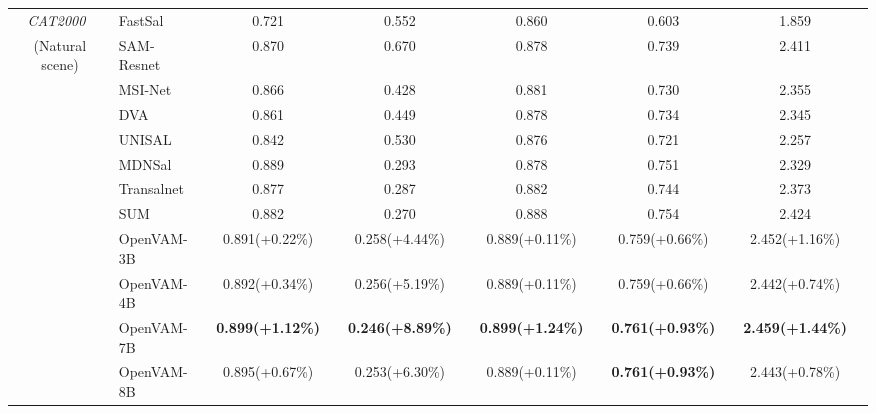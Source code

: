 \begin{table}[t]
{\begin{tabular}{c|lcccccccccc}
    \textit{CAT2000}~\cite{borji2015cat2000}
    & FastSal~\cite{hu2021fastsal} & 0.721 && 0.552 && 0.860 && 0.603 && 1.859 & \\
    (Natural scene)
    & SAM-Resnet~\cite{cornia2018predicting} & 0.870 && 0.670 && 0.878 && 0.739 && 2.411 & \\
    & MSI-Net~\cite{kroner2020contextual} & 0.866 && 0.428 && 0.881 && 0.730 && 2.355 & \\
    & DVA~\cite{wang2017deep} & 0.861 && 0.449 && 0.878 && 0.734 && 2.345 & \\
    & UNISAL~\cite{droste2020unified} & 0.842 && 0.530 && 0.876 && 0.721 && 2.257 & \\
    & MDNSal~\cite{reddy2020tidying} & 0.889 && 0.293 && 0.878 && 0.751 && 2.329 & \\
    & Transalnet~\cite{lou2022transalnet} & 0.877 && 0.287 && 0.882 && 0.744 && 2.373 & \\
    & SUM~\cite{hosseini2025sum} & 0.882 && 0.270 && 0.888 && 0.754 && 2.424 & \\
    \cmidrule{2-12}
    & \cellcolor[HTML]{DADCFF}OpenVAM-3B
    & \cellcolor[HTML]{DADCFF}0.891\scriptsize{(+0.22\%)} && 
      \cellcolor[HTML]{DADCFF}0.258\scriptsize{(+4.44\%)} && 
      \cellcolor[HTML]{DADCFF}0.889\scriptsize{(+0.11\%)} && 
      \cellcolor[HTML]{DADCFF}0.759\scriptsize{(+0.66\%)} && 
      \cellcolor[HTML]{DADCFF}2.452\scriptsize{(+1.16\%)} & \\
    & \cellcolor[HTML]{DADCFF}OpenVAM-4B
    & \cellcolor[HTML]{DADCFF}0.892\scriptsize{(+0.34\%)} && 
      \cellcolor[HTML]{DADCFF}0.256\scriptsize{(+5.19\%)} && 
      \cellcolor[HTML]{DADCFF}0.889\scriptsize{(+0.11\%)} && 
      \cellcolor[HTML]{DADCFF}0.759\scriptsize{(+0.66\%)} && 
      \cellcolor[HTML]{DADCFF}2.442\scriptsize{(+0.74\%)} & \\
    & \cellcolor[HTML]{DADCFF}OpenVAM-7B
    & \cellcolor[HTML]{DADCFF}\textbf{0.899\scriptsize{(+1.12\%)}} && 
      \cellcolor[HTML]{DADCFF}\textbf{0.246\scriptsize{(+8.89\%)}} && 
      \cellcolor[HTML]{DADCFF}\textbf{0.899\scriptsize{(+1.24\%)}} && 
      \cellcolor[HTML]{DADCFF}\textbf{0.761\scriptsize{(+0.93\%)}} && 
      \cellcolor[HTML]{DADCFF}\textbf{2.459\scriptsize{(+1.44\%)}} & \\
    & \cellcolor[HTML]{DADCFF}OpenVAM-8B
    & \cellcolor[HTML]{DADCFF}0.895\scriptsize{(+0.67\%)} && 
      \cellcolor[HTML]{DADCFF}0.253\scriptsize{(+6.30\%)} && 
      \cellcolor[HTML]{DADCFF}0.889\scriptsize{(+0.11\%)} && 
      \cellcolor[HTML]{DADCFF}\textbf{0.761\scriptsize{(+0.93\%)}} && 
      \cellcolor[HTML]{DADCFF}2.443\scriptsize{(+0.78\%)} & \\
    \midrule
    

\end{tabular}}
\end{table}
